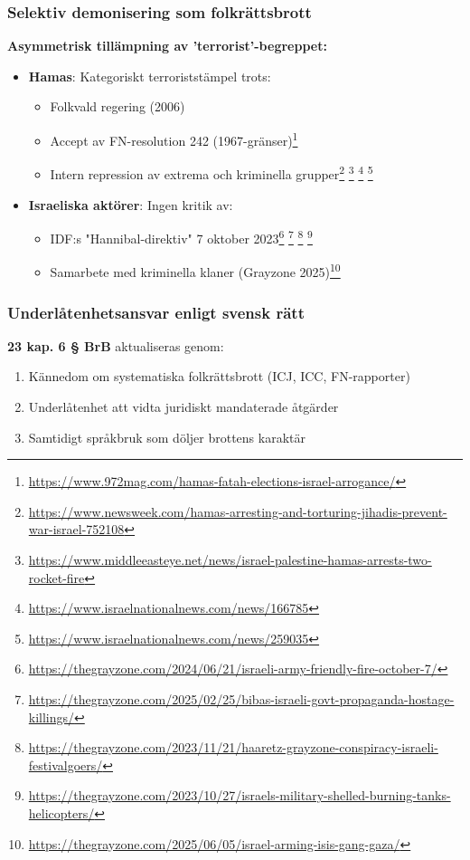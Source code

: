 \subsubsection{Selektiv demonisering som folkrättsbrott}
\textbf{Asymmetrisk tillämpning av 'terrorist'-begreppet:}
\begin{itemize}
\item \textbf{Hamas}: Kategoriskt terroriststämpel trots:
  \begin{itemize}
  \item Folkvald regering (2006)
  \item Accept av FN-resolution 242 (1967-gränser)\footnote{\url{https://www.972mag.com/hamas-fatah-elections-israel-arrogance/}}
  \item Intern repression av extrema och kriminella grupper\footnote{\url{https://www.newsweek.com/hamas-arresting-and-torturing-jihadis-prevent-war-israel-752108}} \footnote{\url{https://www.middleeasteye.net/news/israel-palestine-hamas-arrests-two-rocket-fire}} \footnote{\url{https://www.israelnationalnews.com/news/166785}} \footnote{\url{https://www.israelnationalnews.com/news/259035}}
  \end{itemize}
\item \textbf{Israeliska aktörer}: Ingen kritik av:
  \begin{itemize}
  \item IDF:s "Hannibal-direktiv" 7 oktober 2023\footnote{\url{https://thegrayzone.com/2024/06/21/israeli-army-friendly-fire-october-7/}} \footnote{\url{https://thegrayzone.com/2025/02/25/bibas-israeli-govt-propaganda-hostage-killings/}} \footnote{\url{https://thegrayzone.com/2023/11/21/haaretz-grayzone-conspiracy-israeli-festivalgoers/}} \footnote{\url{https://thegrayzone.com/2023/10/27/israels-military-shelled-burning-tanks-helicopters/}}
  \item Samarbete med kriminella klaner (Grayzone 2025)\footnote{\url{https://thegrayzone.com/2025/06/05/israel-arming-isis-gang-gaza/}}
  \end{itemize}
\end{itemize}

\subsubsection{Underlåtenhetsansvar enligt svensk rätt}
\textbf{23 kap. 6 § BrB} aktualiseras genom:
\begin{enumerate}
\item Kännedom om systematiska folkrättsbrott (ICJ, ICC, FN-rapporter)
\item Underlåtenhet att vidta juridiskt mandaterade åtgärder
\item Samtidigt språkbruk som döljer brottens karaktär
\end{enumerate}

